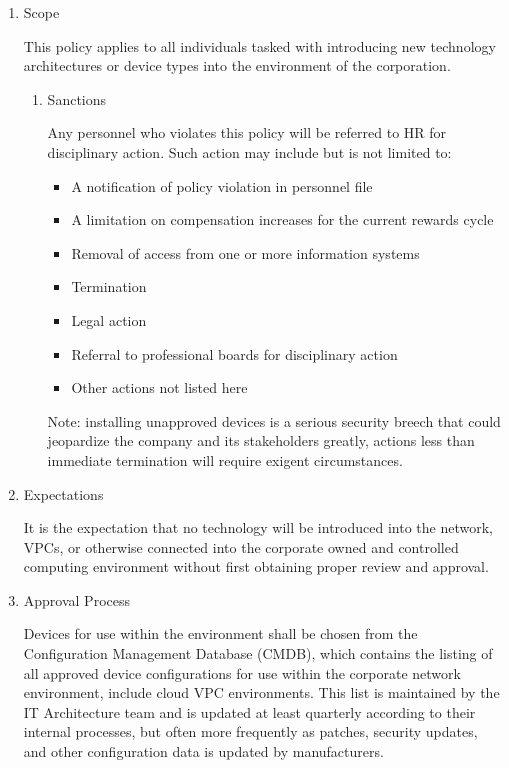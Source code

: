 \documentclass[stu]{apa7}
\begin{document}
\begin{enumerate}
\item Scope
\label{sec:org738549e}

This policy applies to all individuals tasked with introducing new technology architectures or device types into the environment of the corporation.

\begin{enumerate}
\item Sanctions
\label{sec:org1f99ff3}

Any personnel who violates this policy will be referred to HR for disciplinary action. Such action may include but is not limited to:

\begin{itemize}
\item A notification of policy violation in personnel file
\item A limitation on compensation increases for the current rewards cycle
\item Removal of access from one or more information systems
\item Termination
\item Legal action
\item Referral to professional boards for disciplinary action
\item Other actions not listed here
\end{itemize}

Note: installing unapproved devices is a serious security breech that could jeopardize the company and its stakeholders greatly, actions less than immediate termination will require exigent circumstances.
\end{enumerate}

\item Expectations
\label{sec:org982f2c6}

It is the expectation that no technology will be introduced into the network, VPCs, or otherwise connected into the corporate owned and controlled computing environment without first obtaining proper review and approval.

\item Approval Process
\label{sec:orga20f414}

Devices for use within the environment shall be chosen from the Configuration Management Database (CMDB), which contains the listing of all approved device configurations for use within the corporate network environment, include cloud VPC environments. This list is maintained by the IT Architecture team and is updated at least quarterly according to their internal processes, but often more frequently as patches, security updates, and other configuration data is updated by manufacturers.


\end{enumerate}
\end{document}
